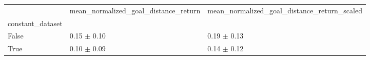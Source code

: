 \begin{tabular}{lll}
\toprule
 & mean_normalized_goal_distance_return & mean_normalized_goal_distance_return_scaled \\
constant_dataset &  &  \\
\midrule
False & 0.15 $\pm$ 0.10 & 0.19 $\pm$ 0.13 \\
True & 0.10 $\pm$ 0.09 & 0.14 $\pm$ 0.12 \\
\bottomrule
\end{tabular}
